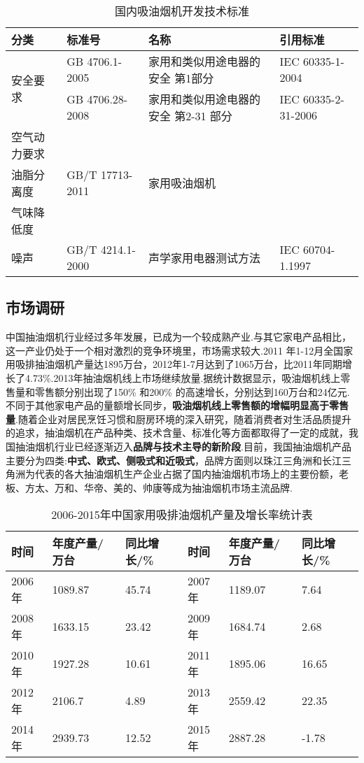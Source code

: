 {\footnotesize{\begin{longtable}{l|l|l|l}
\caption{国内吸油烟机开发技术标准}  \\
\hline
分类 & 标准号 & 名称 & 引用标准\\
\hline
\multirow{2}{*}{安全要求} & GB 4706.1-2005 & 家用和类似用途电器的安全 第1部分 & IEC 60335-1-2004 \\
\cline{2-4}
 & GB 4706.28-2008 & 家用和类似用途电器的安全 第2-31 部分& IEC 60335-2-31-2006  \\
\hline
空气动力要求  & \multirow{3}{*}{GB/T 17713-2011} & \multirow{3}{*}{家用吸油烟机}  \\
油脂分离度 &   &  \\
气味降低度 &   &  \\
\hline
噪声 & GB/T 4214.1-2000 & 声学家用电器测试方法 & IEC 60704-1.1997 \\
\hline
\end{longtable}}}

\subsection{市场调研}
中国抽油烟机行业经过多年发展，已成为一个较成熟产业.与其它家电产品相比，这一产业仍处于一个相对激烈的竞争环境里，市场需求较大.2011 年1-12月全国家用吸排抽油烟机产量达1895万台，2012年1-7月达到了1065万台，比2011年同期增长了4.73\%.2013年抽油烟机线上市场继续放量.据统计数据显示，吸油烟机线上零售量和零售额分别出现了150\% 和200\% 的高速增长，分别达到160万台和24亿元.不同于其他家电产品的量额增长同步，{\bf{吸油烟机线上零售额的增幅明显高于零售量}}.随着企业对居民烹饪习惯和厨房环境的深入研究，随着消费者对生活品质提升的追求，抽油烟机在产品种类、技术含量、标准化等方面都取得了一定的成就，我国抽油烟机行业已经逐渐迈入{\bf{品牌与技术主导的新阶段}}.目前，我国抽油烟机产品主要分为四类:{\bf{中式、欧式、侧吸式和近吸式}}，品牌方面则以珠江三角洲和长江三角洲为代表的各大抽油烟机生产企业占据了国内抽油烟机市场上的主要份额，老板、方太、万和、华帝、美的、帅康等成为抽油烟机市场主流品牌.

{\footnotesize{\begin{longtable}{|l|l|l||l|l|l|}
\caption{2006-2015年中国家用吸排油烟机产量及增长率统计表}  \\
\hline
    时间    & 年度产量/万台 & 同比增长/\% & 时间    & 年度产量/万台 & 同比增长/\%  \\
    \hline
    2006年 & 1089.87 & 45.74 & 2007年 & 1189.07 & 7.64 \\
    2008年 & 1633.15 & 23.42 & 2009年 & 1684.74 & 2.68 \\
    2010年 & 1927.28 & 10.61 & 2011年 & 1895.06 & 16.65 \\
    2012年 & 2106.7 & 4.89 & 2013年 & 2559.42 & 22.35 \\
    2014年 & 2939.73 & 12.52 & 2015年 & 2887.28 & -1.78 \\
  \hline
\end{longtable}}}

